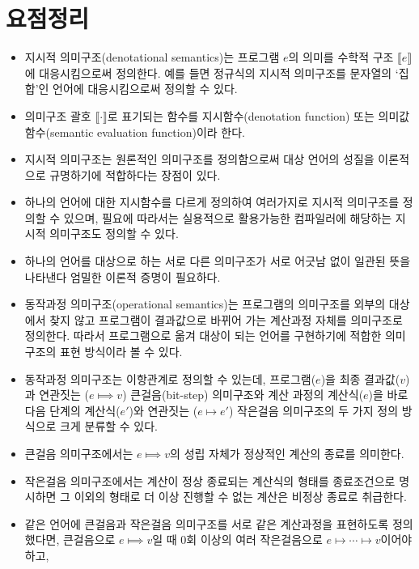 \section*{요점정리}
\begin{itemize}
 \item 지시적 의미구조(denotational semantics)는 프로그램 $e$의 의미를
       수학적 구조 $\llbracket e\rrbracket$에 대응시킴으로써 정의한다.
       예를 들면 정규식의 지시적 의미구조를 문자열의 `집합'인 언어에
       대응시킴으로써 정의할 수 있다.
 \item 의미구조 괄호 $\llbracket \cdot \rrbracket$로 표기되는
       함수를 지시함수(denotation function) 또는
       의미값함수(semantic evaluation function)이라 한다.
 \item 지시적 의미구조는 원론적인 의미구조를 정의함으로써 대상 언어의
       성질을 이론적으로 규명하기에 적합하다는 장점이 있다.
 \item 하나의 언어에 대한 지시함수를 다르게 정의하여 여러가지로
       지시적 의미구조를 정의할 수 있으며, 필요에 따라서는 실용적으로
       활용가능한 컴파일러에 해당하는 지시적 의미구조도 정의할 수 있다.
 \item 하나의 언어를 대상으로 하는 서로 다른 의미구조가 서로 어긋남
       없이 일관된 뜻을 나타낸다 엄밀한 이론적 증명이 필요하다.
 \item 동작과정 의미구조(operational semantics)는 프로그램의 의미구조를
       외부의 대상에서 찾지 않고 프로그램이 결과값으로 바뀌어 가는
       계산과정 자체를 의미구조로 정의한다. 따라서 프로그램으로 옮겨
       대상이 되는 언어를 구현하기에 적합한 의미구조의 표현 방식이라 볼 수 있다.
 \item 동작과정 의미구조는 이항관계로 정의할 수 있는데,
       프로그램($e$)을 최종 결과값($v$)과 연관짓는 ($e\Longmapsto v$)
       큰걸음(bit-step) 의미구조와 계산 과정의 계산식($e$)을 바로
       다음 단계의 계산식($e'$)와 연관짓는 ($e\longmapsto e'$)
       작은걸음 의미구조의 두 가지 정의 방식으로 크게 분류할 수 있다.
 \item 큰걸음 의미구조에서는 $e\Longmapsto v$의 성립 자체가 정상적인
       계산의 종료를 의미한다.
 \item 작은걸음 의미구조에서는 계산이 정상 종료되는 계산식의 형태를
       종료조건으로 명시하면 그 이외의 형태로 더 이상 진행할 수 없는
       계산은 비정상 종료로 취급한다.
 \item 같은 언어에 큰걸음과 작은걸음 의미구조를 서로 같은 계산과정을
       표현하도록 정의했다면, 큰걸음으로 $e\Longmapsto v$일 때
       0회 이상의 여러 작은걸음으로 $e\longmapsto \cdots \longmapsto v$이어야 하고,

\end{itemize}
